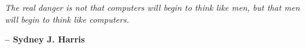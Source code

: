 \chapter*{}
\vspace*{\fill}

\begin{center}
\begin{minipage}{0.7\textwidth}
\itshape
    The real danger is not that computers will begin to think like men,
    but that men will begin to think like computers.
\end{minipage}
\end{center}
\hspace*{0.6\textwidth} {\bfseries -- Sydney J. Harris}


\vspace*{\fill}
\newpage
